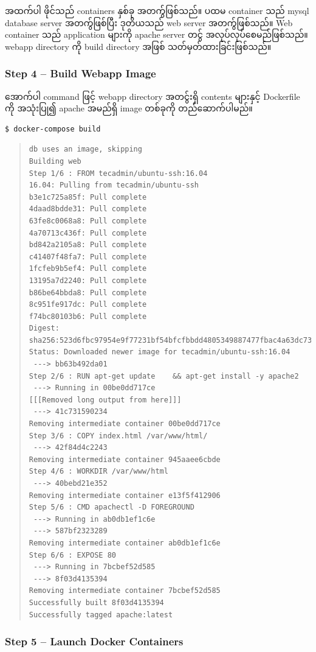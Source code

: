 အထက်ပါ ဖိုင်သည် containers နှစ်ခု အတက်ွဖြစ်သည်။ ပထမ container သည် mysql
database server အတက်ွဖြစ်ပြီး ဒုတိယသည် web server အတက်ွဖြစ်သည်။ Web
container သည် application များကို apache server တင်ွ
အလုပ်လုပ်စေမည်ဖြစ်သည်။ webapp directory ကို build directory အဖြစ်
သတ်မှတ်ထားခြင်းဖြစ်သည်။

\hypertarget{step-4-build-webapp-image}{%
\subsubsection{Step 4 -- Build Webapp
Image}\label{step-4-build-webapp-image}}

အောက်ပါ command ဖြင့် webapp directory အတင်ွးရှိ contents များနှင့်
Dockerfile ကို အသုံးပြု၍ apache အမည်ရှိ image တစ်ခုကို တည်ဆောက်ပါမည်။

\begin{verbatim}
$ docker-compose build
\end{verbatim}

\begin{quote}
\begin{verbatim}
db uses an image, skipping
Building web
Step 1/6 : FROM tecadmin/ubuntu-ssh:16.04
16.04: Pulling from tecadmin/ubuntu-ssh
b3e1c725a85f: Pull complete
4daad8bdde31: Pull complete
63fe8c0068a8: Pull complete
4a70713c436f: Pull complete
bd842a2105a8: Pull complete
c41407f48fa7: Pull complete
1fcfeb9b5ef4: Pull complete
13195a7d2240: Pull complete
b86be64bbda8: Pull complete
8c951fe917dc: Pull complete
f74bc80103b6: Pull complete
Digest: sha256:523d6fbc97954e9f77231bf54bfcfbbdd4805349887477fbac4a63dc735d777d
Status: Downloaded newer image for tecadmin/ubuntu-ssh:16.04
 ---> bb63b492da01
Step 2/6 : RUN apt-get update    && apt-get install -y apache2
 ---> Running in 00be0dd717ce
[[[Removed long output from here]]]
 ---> 41c731590234
Removing intermediate container 00be0dd717ce
Step 3/6 : COPY index.html /var/www/html/
 ---> 42f84d4c2243
Removing intermediate container 945aaee6cbde
Step 4/6 : WORKDIR /var/www/html
 ---> 40bebd21e352
Removing intermediate container e13f5f412906
Step 5/6 : CMD apachectl -D FOREGROUND
 ---> Running in ab0db1ef1c6e
 ---> 587bf2323289
Removing intermediate container ab0db1ef1c6e
Step 6/6 : EXPOSE 80
 ---> Running in 7bcbef52d585
 ---> 8f03d4135394
Removing intermediate container 7bcbef52d585
Successfully built 8f03d4135394
Successfully tagged apache:latest
\end{verbatim}
\end{quote}

\hypertarget{step-5-launch-docker-containers}{%
\subsubsection{Step 5 -- Launch Docker
Containers}\label{step-5-launch-docker-containers}}

